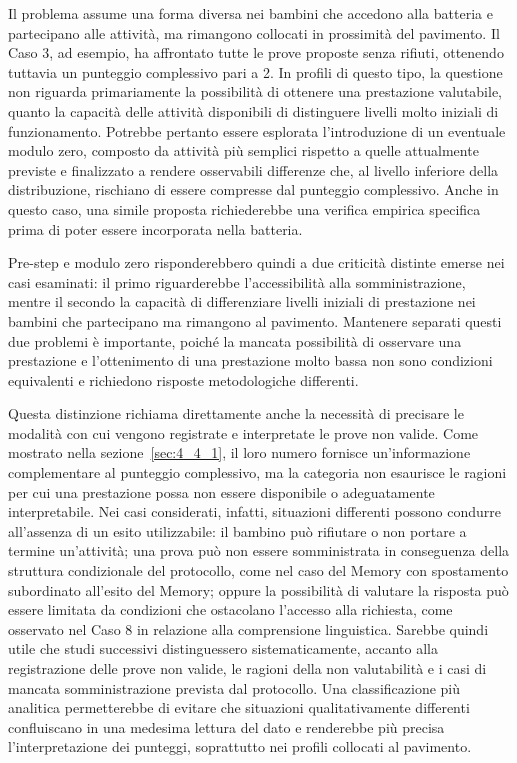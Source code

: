Il problema assume una forma diversa nei bambini che accedono alla batteria e partecipano alle attività, ma rimangono collocati in prossimità del pavimento. Il Caso 3, ad esempio, ha affrontato tutte le prove proposte senza rifiuti, ottenendo tuttavia un punteggio complessivo pari a 2. In profili di questo tipo, la questione non riguarda primariamente la possibilità di ottenere una prestazione valutabile, quanto la capacità delle attività disponibili di distinguere livelli molto iniziali di funzionamento. Potrebbe pertanto essere esplorata l'introduzione di un eventuale modulo zero, composto da attività più semplici rispetto a quelle attualmente previste e finalizzato a rendere osservabili differenze che, al livello inferiore della distribuzione, rischiano di essere compresse dal punteggio complessivo. Anche in questo caso, una simile proposta richiederebbe una verifica empirica specifica prima di poter essere incorporata nella batteria.

Pre-step e modulo zero risponderebbero quindi a due criticità distinte emerse nei casi esaminati: il primo riguarderebbe l'accessibilità alla somministrazione, mentre il secondo la capacità di differenziare livelli iniziali di prestazione nei bambini che partecipano ma rimangono al pavimento. Mantenere separati questi due problemi è importante, poiché la mancata possibilità di osservare una prestazione e l'ottenimento di una prestazione molto bassa non sono condizioni equivalenti e richiedono risposte metodologiche differenti.

Questa distinzione richiama direttamente anche la necessità di precisare le modalità con cui vengono registrate e interpretate le prove non valide. Come mostrato nella sezione~\ref{sec:4_4_1}, il loro numero fornisce un'informazione complementare al punteggio complessivo, ma la categoria non esaurisce le ragioni per cui una prestazione possa non essere disponibile o adeguatamente interpretabile. Nei casi considerati, infatti, situazioni differenti possono condurre all'assenza di un esito utilizzabile: il bambino può rifiutare o non portare a termine un'attività; una prova può non essere somministrata in conseguenza della struttura condizionale del protocollo, come nel caso del Memory con spostamento subordinato all'esito del Memory; oppure la possibilità di valutare la risposta può essere limitata da condizioni che ostacolano l'accesso alla richiesta, come osservato nel Caso 8 in relazione alla comprensione linguistica. Sarebbe quindi utile che studi successivi distinguessero sistematicamente, accanto alla registrazione delle prove non valide, le ragioni della non valutabilità e i casi di mancata somministrazione prevista dal protocollo. Una classificazione più analitica permetterebbe di evitare che situazioni qualitativamente differenti confluiscano in una medesima lettura del dato e renderebbe più precisa l'interpretazione dei punteggi, soprattutto nei profili collocati al pavimento.

